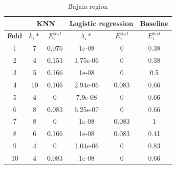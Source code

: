 \documentclass[10pt]{article}
\numberwithin{equation}{section}
\numberwithin{figure}{section}
\numberwithin{table}{section}
\begin{document}
\begin{table}[H]
\centering
\begin{tabular}{c|c|c|c|c|c|}
\cline{2-6}
\multicolumn{1}{l|}{\textbf{}}      & \multicolumn{2}{c|}{\textbf{KNN}}       & \multicolumn{2}{c|}{\textbf{Logistic regression}} & \textbf{Baseline}     \\ \hline
\multicolumn{1}{|c|}{\textbf{Fold}} & \textbf{$k_i*$} & \textbf{$E_i^{test}$} & \textbf{$\lambda_i*$}  & \textbf{$E_i^{test}$}  & \textbf{$E_i^{test}$} \\ \hline
\multicolumn{1}{|c|}{1}             & 7               & 0.076                  & 1e-08                     & 0                & 0.38                  \\ \hline
\multicolumn{1}{|c|}{2}             & 4               & 0.153                   & 1.75e-06                     & 0                   & 0.38                  \\ \hline
\multicolumn{1}{|c|}{3}             & 5               & 0.166                  & 1e-08                     & 0                     & 0.5                  \\ \hline
\multicolumn{1}{|c|}{4}             & 10               & 0.166                  & 2.94e-06                     & 0.083                     & 0.66                  \\ \hline
\multicolumn{1}{|c|}{5}             & 4               & 0                  & 7.9e-08                     & 0                   & 0.66                  \\ \hline
\multicolumn{1}{|c|}{6}             & 8               & 0.083                  &  6.25e-07                     & 0                   & 0.66                  \\ \hline
\multicolumn{1}{|c|}{7}             & 8             & 0                   & 1e-08                     & 0.083                   & 1                  \\ \hline
\multicolumn{1}{|c|}{8}             & 6               & 0.166                  & 1e-08                     & 0.083                   & 0.41                  \\ \hline
\multicolumn{1}{|c|}{9}             & 4               & 0                   & 1.04e-06                     & 0                  & 0.83                  \\ \hline
\multicolumn{1}{|c|}{10}            & 4               & 0.083                  & 1e-08                     &   0                 & 0.66                  \\ \hline
\end{tabular}
\caption{Bajaia region}
\label{Table11}
\end{table}
\end{document}
